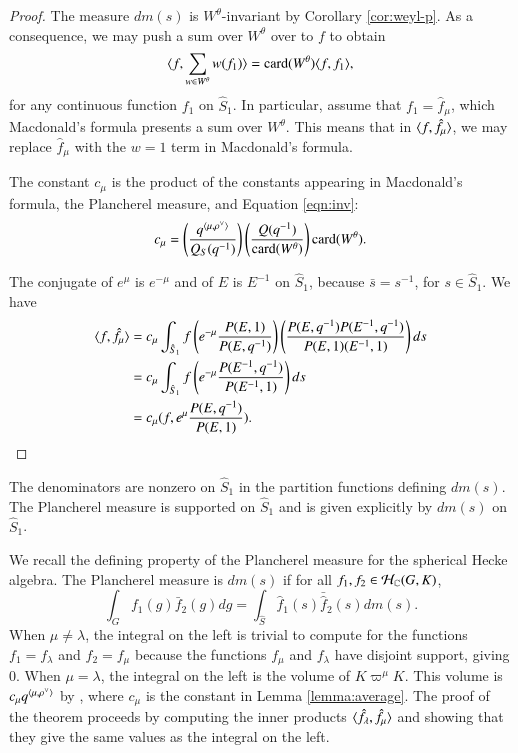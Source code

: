 \begin{proof}  
  The measure $dm(s)$ is $W^\theta$-invariant by Corollary
  \ref{cor:weyl-p}.  As a consequence, we may push a sum over
  $W^\theta$ over to $f$ to obtain
\begin{equation}\label{eqn:inv}
\langle{f,\sum_{w\in W^\theta} w(f_1)}\rangle = {\operatorname{card}}(W^\theta)\langle{f,f_1}\rangle,
\end{equation}
for any continuous function $f_1$ on $\hat S_1$.
In particular, assume that $f_1=\hat f_\mu$, which Macdonald's
formula presents a sum over $W^\theta$.
This means that in $\langle{f,\hat f_\mu}\rangle$, we may replace 
$\hat f_\mu$  with
the $w=1$ term  in Macdonald's formula.

The constant $c_\mu$ is the product of the constants appearing in
Macdonald's formula, the Plancherel measure, and Equation
\ref{eqn:inv}:
\[
c_\mu = \left(\frac{q^{\langle{\mu,\rho^\vee}\rangle}}{Q_S(q^{-1})}\right)
\left(\frac{Q(q^{-1})}{{\operatorname{card}}(W^\theta)}\right) {\operatorname{card}}(W^\theta).
\]

The conjugate of $e^\mu$ is $e^{-\mu}$ and of $E$ is $E^{-1}$ on $\hat
S_1$, because $\bar s = s^{-1}$, for $s\in \hat S_1$.  We have
\begin{align*}
\langle{f,\hat f_\mu}\rangle &=
c_\mu\int_{\hat S_1} f \left(e^{-\mu}
                     \frac{P(E,1)}{P(E,q^{-1})}\right) 
\left(\frac{P(E,q^{-1}) P(E^{-1},q^{-1})}{P(E,1)(E^{-1},1)}\right) ds\\
&=
c_\mu\int_{\hat S_1} f \left(e^{-\mu} 
\frac{P(E^{-1},q^{-1})}{P(E^{-1},1)}\right) ds\\
&=
c_\mu (f, e^\mu\frac{ P(E,q^{-1})}{P(E,1)}).
\end{align*}
\end{proof}

\begin{theorem}
  The denominators are nonzero on $\hat S_1$ in the partition
  functions defining $dm(s)$.  The Plancherel measure is supported on
  $\hat S_1$ and is given explicitly by $dm(s)$ on $\hat S_1$.
\end{theorem}

\begin{remark}
  We recall the defining property of the Plancherel measure for the
  spherical Hecke algebra.  The Plancherel measure is $dm(s)$ if for
  all $f_1,f_2\in \mathcal H_{\mathbb{C}}(G,K)$,
\[
\int_G f_1(g) \bar f_2 (g) dg = \int_{\hat S} \hat f_1(s) \bar {\hat f}_2 (s) dm(s).
\]
When $\mu\ne\lambda$, the integral on the left is trivial to compute
for the functions $f_1 = f_\lambda$ and $f_2 = f_\mu$ because the
functions $f_\mu$ and $f_\lambda$ have disjoint support, giving $0$.
When $\mu=\lambda$, the integral on the left is the volume of
$K\varpi^\mu K$.  This volume is $c_\mu q^{\langle{\mu,\rho^\vee}\rangle}$ by
\cite{casselman2005companion}, where $c_\mu$ is the constant in Lemma
\ref{lemma:average}.  The proof of the theorem proceeds by computing
the inner products $\langle{\hat f_\lambda,\hat f_\mu}\rangle$ and showing that
they give the same values as the integral on the left.
\end{remark}

